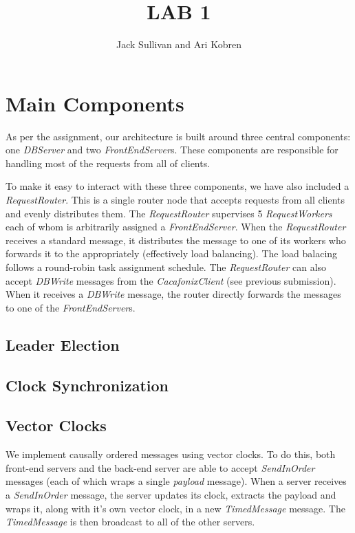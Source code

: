 \documentclass[11pt]{article}
\begin{document}
\title{LAB 1}
\author{Jack Sullivan and Ari Kobren}
\maketitle

\section{Main Components}
As per the assignment, our architecture is built around three central
components: one \emph{DBServer} and two \emph{FrontEndServer}s. These
components are responsible for handling most of the requests from all
of clients.

To make it easy to interact with these three components, we have also
included a \emph{RequestRouter}.  This is a single router node that
accepts requests from all clients and evenly distributes them. The
\emph{RequestRouter} supervises 5 \emph{RequestWorkers} each of whom
is arbitrarily assigned a \emph{FrontEndServer}. When the
\emph{RequestRouter} receives a standard message, it distributes the
message to one of its workers who forwards it to the appropriately
(effectively load balancing). The load balacing follows a round-robin
task assignment schedule.  The \emph{RequestRouter} can also accept
\emph{DBWrite} messages from the \emph{CacafonixClient} (see previous
submission).  When it receives a \emph{DBWrite} message, the router
directly forwards the messages to one of the \emph{FrontEndServer}s.

\subsection{Leader Election}

\subsection{Clock Synchronization}

\subsection{Vector Clocks}
We implement causally ordered messages using vector clocks.  To do
this, both front-end servers and the back-end server are able to
accept \emph{SendInOrder} messages (each of which wraps a single
\emph{payload} message).  When a server receives a \emph{SendInOrder}
message, the server updates its clock, extracts the payload and wraps
it, along with it's own vector clock, in a new \emph{TimedMessage}
message.  The \emph{TimedMessage} is then broadcast to all of the
other servers.
\end{document}
